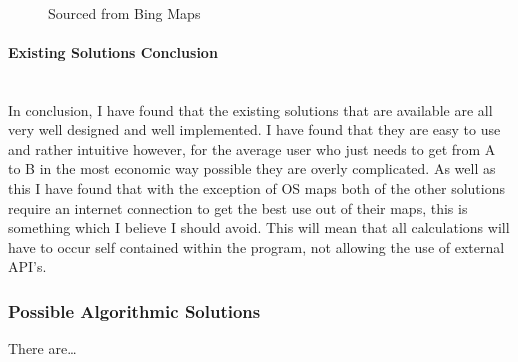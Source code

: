 \begin{flushleft}
            \bk
            
            \begin{figure}[H]
                \centering
                \caption*{Sourced from Bing Maps\textsuperscript{\tiny\textcopyright}}
            \end{figure}

            \bk
            
            \paragraph{Existing Solutions Conclusion} \mbox{} \\
            In conclusion, I have found that the existing solutions that are available are all very well designed and well implemented. I have found that they are easy to use and rather intuitive
            however, for the average user who just needs to get from A to B in the most economic way possible they are overly complicated. As well as this I have found that with the exception of OS maps
            both of the other solutions require an internet connection to get the best use out of their maps, this is something which I believe I should avoid. This will mean that all calculations will 
            have to occur self contained within the program, not allowing the use of external API's. \\
            \bk

            \subsubsection{Possible Algorithmic Solutions}
            There are\dots
            \bk


\end{flushleft}
